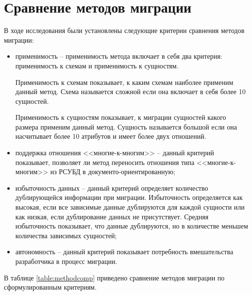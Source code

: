 \section{Сравнение методов миграции}
В ходе исследования были установлены следующие критерии сравнения методов миграции:
\begin{itemize}[label=---]
    \item применимость -- применимость метода включает в себя два критерия: применимость к схемам и применимость к сущностям.
    
    Применимость к схемам показывает, к каким схемам наиболее применим данный метод.
    Схема называется сложной если она включает в себя более 10 сущностей.

    Применимость к сущностям показывает, к миграции сущностей какого размера применим данный метод.
    Сущность называется большой если она насчитывает более 10 атрибутов и имеет более двух отношений.
    \item поддержка отношения <<многие-к-многим>> -- данный критерий показывает,
    позволяет ли метод переносить отношения типа <<многие-к-многим>> из РСУБД в документо-ориентированную;
    \item избыточность данных -- данный критерий определяет количество дублирующейся информации при миграции.
    Избыточность определяется как высокая, если все зависимые данные дублируются для каждой сущности или как низкая, если дублирование данных не присутствует.
    Средняя избыточность показывает, что данные дублируются, но в количестве меньшем количества зависимых сущностей;
    \item автономность -- данный критерий показывает потребность вмешательства разработчика в процесс миграции.
\end{itemize}

\clearpage
 
В таблице \ref{table:methodcomp} приведено сравнение методов миграции по сформулированным критериям.

